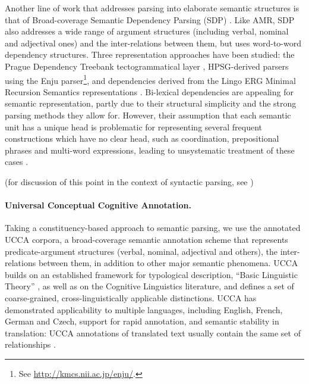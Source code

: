 \documentclass[11pt]{article}
\begin{document}
Another line of work that addresses parsing into elaborate semantic structures
is that of Broad-coverage Semantic Dependency Parsing (SDP) \cite{oepen2014semeval,oepen2015semeval}.
Like AMR, SDP also addresses a wide range of argument structures (including verbal, nominal and
adjectival ones) and the inter-relations between them, but uses word-to-word dependency structures.
Three representation approaches have been studied:
the Prague Dependency Treebank tectogrammatical layer \cite{bohmova2003prague},
HPSG-derived parsers using the Enju parser\footnote{See \url{http://kmcs.nii.ac.jp/enju/}.},
and dependencies derived from the Lingo ERG Minimal Recursion Semantics representations \cite{Flic:02}.
Bi-lexical dependencies are appealing for semantic representation, partly due to
their structural simplicity and the strong parsing methods they allow for.
However, their assumption that each semantic unit has a unique head is
problematic for representing several frequent constructions which have no clear
head, such as coordination, prepositional phrases and multi-word expressions,
leading to unsystematic treatment of these cases \cite{schwartz2011neutralizing,Ivanova2012who,tsarfaty2012cross}.

(for discussion of this point in the context of syntactic parsing, see
\cite{kallmeyer2013data,pitler2015linear})

\paragraph{Universal Conceptual Cognitive Annotation.}\label{subsec:ucca}
Taking a constituency-based approach to semantic parsing,
we use the annotated UCCA corpora, a broad-coverage semantic annotation scheme that
represents predicate-argument structures (verbal, nominal, adjectival and others),
the inter-relations between them, in addition to other major semantic phenomena.
UCCA builds on an established framework
for typological description, ``Basic Linguistic Theory''
\cite{Dixon:10b,Dixon:10a,Dixon:12}, as well as on the Cognitive Linguistics literature,
and defines a set of coarse-grained, cross-linguistically applicable distinctions.
UCCA has demonstrated applicability to multiple languages, including English, French, German and
Czech, support for rapid annotation, and semantic stability in translation: UCCA
annotations of translated text usually contain the same set of relationships
\cite{sulem2015conceptual}.
\end{document}
